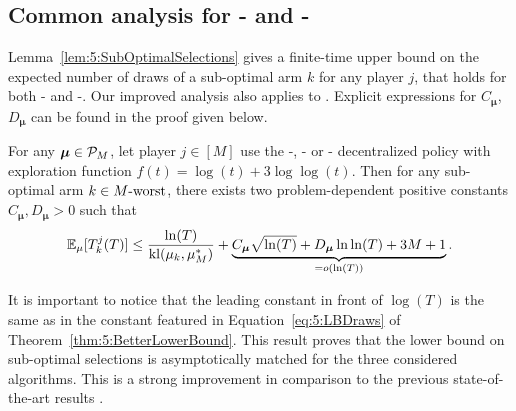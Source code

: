 \subsection{Common analysis for \RandTopM- and \MCTopM-\klUCB{}}\label{sub:5:UpperBoundSelections}

Lemma~\ref{lem:5:SubOptimalSelections} gives a finite-time upper bound on the expected number of draws of a sub-optimal arm $k$ for any player $j$, that
holds for both \RandTopM-\klUCB{} and \MCTopM-\klUCB.
Our improved analysis also applies to \rhoRand{}.
Explicit expressions for $C_{\boldsymbol{\mu}}$, $D_{\boldsymbol{\mu}}$ can be found in the proof given below.

\begin{lemma}\label{lem:5:SubOptimalSelections}
  For any $\boldsymbol{\mu}\in\mathcal{P}_M$,
  let player $j\in[M]$ use the \RandTopM-, \MCTopM- or \rhoRand-\klUCB{}
  decentralized policy with exploration function $f(t) = \log(t) + 3 \log\log(t)$.
  Then for any sub-optimal arm $k \in M\text{-}\mathrm{worst}$, there exists two problem-dependent positive constants $C_{\boldsymbol{\mu}}, D_{\boldsymbol{\mu}} > 0$ such that
  \begin{equation}\label{eq:5:SubOptimalSelections}
      \mathbb{E}_{\mu}[T_k^j(T)] \leq
      \frac{\ln(T)}{\mathrm{kl}(\mu_k,\mu_{M}^*)}
      + \underbrace{C_{\boldsymbol{\mu}} \sqrt{\ln(T)} + D_{\boldsymbol{\mu}}\ln\ln(T) + 3M + 1}_{= \mathop{}\mathopen{}o\mathopen{}\left(\ln(T)\right)}.
  \end{equation}
\end{lemma}

It is important to notice that the leading constant in front of $\log(T)$ is the same as in the constant featured in Equation~\eqref{eq:5:LBDraws} of Theorem~\ref{thm:5:BetterLowerBound}. This result proves that the lower bound on sub-optimal selections is asymptotically matched for the three considered algorithms. This is a strong improvement in comparison to the previous state-of-the-art results
\citep{Zhao10,Anandkumar11}.

